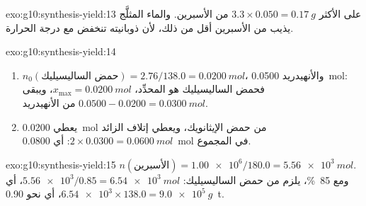 \begin{solution}{exo:g10:synthesis-yield:13}
على الأكثر $3.3 \times 0.050 = \qty{0.17}{g}$ من الأسبرين. والماء المثلَّج يذيب
من الأسبرين أقل من ذلك، لأن ذوبانيته تنخفض مع
درجة الحرارة.
\end{solution}

\begin{solution}{exo:g10:synthesis-yield:14}
\begin{enumerate}
  \item $n_0(\text{حمض الساليسيليك}) = 2.76 / 138.0 = \qty{0.0200}{mol}$،
        والأنهيدريد \qty{0.0500}{mol}: فحمض الساليسيليك هو المحدِّد،
        $x_{\max} = \qty{0.0200}{mol}$، ويبقى $0.0500 - 0.0200 =
        \qty{0.0300}{mol}$ من الأنهيدريد.
  \item يعطي  \qty{0.0200}{mol} من حمض الإيثانويك، ويعطي إتلاف
        الزائد $2 \times 0.0300 = \qty{0.0600}{mol}$:
        أي \qty{0.0800}{mol} في المجموع.
\end{enumerate}
\end{solution}

\begin{solution}{exo:g10:synthesis-yield:15}
$n(\text{الأسبرين}) = \num{1.00e6} / 180.0 = \qty{5.56e3}{mol}$. ومع
 \qty{85}{\percent}، يلزم من حمض الساليسيليك:
$\num{5.56e3} / 0.85 = \qty{6.54e3}{mol}$، أي
$\num{6.54e3} \times 138.0 = \qty{9.0e5}{g}$، أي نحو \qty{0.90}{t}.
\end{solution}

